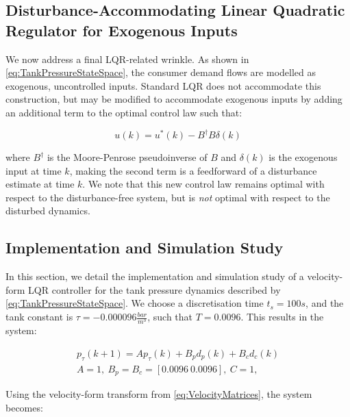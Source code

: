 \subsection{Disturbance-Accommodating Linear Quadratic Regulator for Exogenous Inputs}\label{subsec:DALQR}

We now address a final LQR-related wrinkle. As shown in \cref{eq:TankPressureStateSpace}, the consumer demand flows are modelled as exogenous, uncontrolled inputs. Standard LQR does not accommodate this construction, but may be modified to accommodate exogenous inputs by adding an additional term to the optimal control law \cite{Singh2017} such that:


\begin{equation}\label{eq:ELQRControlLaw}
	u(k) = u^*(k) - B^\dagger B \delta(k)
\end{equation}

where $B^\dagger$ is the Moore-Penrose pseudoinverse of $B$ and $\delta(k)$ is the exogenous input at time $k$, making the second term is a feedforward of a disturbance estimate at time $ k $. We note that this new control law remains optimal with respect to the disturbance-free system, but is \textit{not} optimal with respect to the disturbed dynamics.

\subsection{Implementation and Simulation Study}\label{subsec:LQRSimulationStudy}

In this section, we detail the implementation and simulation study of a velocity-form LQR controller for the tank pressure dynamics described by \cref{eq:TankPressureStateSpace}. We choose a discretisation time $t_s = 100 \si{s}$, and the tank constant is $\tau = -0.000096 \frac{\si{bar}}{\si{m^3}}$, such that $T = 0.0096$. This results in the system:

\begin{equation}\label{eq:TankPressureMatrices}
	\begin{gathered}
		p_\tau(k+1) = A p_\tau(k) + B_p d_p(k) + B_c d_c(k)  \\
		A = 1, \ B_p = B_c = [0.0096 \ 0.0096], \ C = 1 ,
	\end{gathered}
\end{equation}

Using the velocity-form transform from \cref{eq:VelocityMatrices}, the system becomes:


